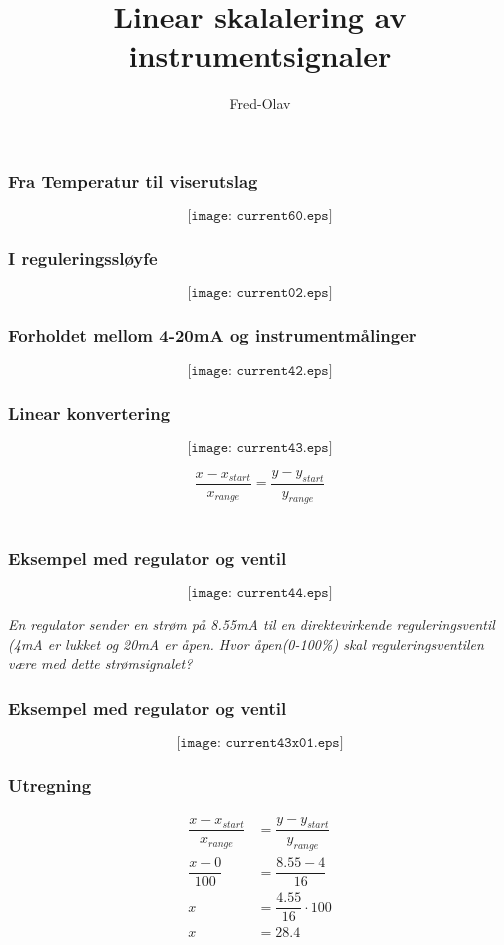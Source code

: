 \documentclass{beamer}
\title{Linear skalalering av instrumentsignaler}
\author{Fred-Olav}
\begin{document}
\maketitle

\begin{frame}
	\frametitle{Fra Temperatur til viserutslag}

	
	$$\texttt{[image: current60.eps]}$$

\end{frame}
\begin{frame}
	\frametitle{I reguleringssløyfe}

	
	$$\texttt{[image: current02.eps]}$$

\end{frame}
\begin{frame}
	\frametitle{Forholdet mellom 4-20mA og instrumentmålinger}

	
	$$\texttt{[image: current42.eps]}$$

\end{frame}

\begin{frame}
	\frametitle{Linear konvertering}

	
	$$\texttt{[image: current43.eps]}$$

	$$\dfrac{x-x_{start}}{x_{range}}=\dfrac{y-y_{start}}{y_{range}}$$\\
\end{frame}

\begin{frame}
	\frametitle{Eksempel med regulator og ventil}

	

	$$\texttt{[image: current44.eps]}$$


\noindent
	\textit{En regulator sender en strøm på 8.55mA til en direktevirkende reguleringsventil (4mA er lukket og 20mA er åpen. Hvor åpen(0-100\%) skal reguleringsventilen være med dette strømsignalet? }

\vskip 10pt


\end{frame}

	\begin{frame}
		\frametitle{Eksempel med regulator og ventil}

		
	$$\texttt{[image: current43x01.eps]}$$

	\end{frame}





\vskip 10pt



\begin{frame}
	\frametitle{Utregning}

	\begin{align*}
		\dfrac{x-x_{start}}{x_{range}}&=\dfrac{y-y_{start}}{y_{range}}\\
		\dfrac{x-0}{100}&=\dfrac{8.55-4}{16}\\
		x&=\dfrac{4.55}{16}\cdot 100\\
		x&=28.4\\
	\end{align*}
	

\end{frame}
\end{document}
